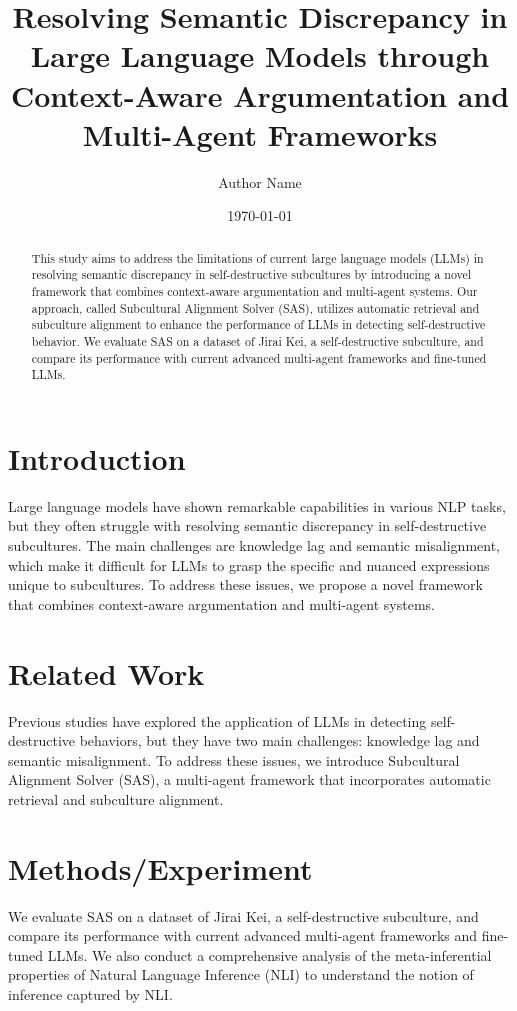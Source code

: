 \documentclass{article}
\begin{document}
\title{Resolving Semantic Discrepancy in Large Language Models through Context-Aware Argumentation and Multi-Agent Frameworks}
\author{Author Name}
\date{\today}

\maketitle

\begin{abstract}
This study aims to address the limitations of current large language models (LLMs) in resolving semantic discrepancy in self-destructive subcultures by introducing a novel framework that combines context-aware argumentation and multi-agent systems. Our approach, called Subcultural Alignment Solver (SAS), utilizes automatic retrieval and subculture alignment to enhance the performance of LLMs in detecting self-destructive behavior. We evaluate SAS on a dataset of Jirai Kei, a self-destructive subculture, and compare its performance with current advanced multi-agent frameworks and fine-tuned LLMs.
\end{abstract}

\section{Introduction}
Large language models have shown remarkable capabilities in various NLP tasks, but they often struggle with resolving semantic discrepancy in self-destructive subcultures. The main challenges are knowledge lag and semantic misalignment, which make it difficult for LLMs to grasp the specific and nuanced expressions unique to subcultures. To address these issues, we propose a novel framework that combines context-aware argumentation and multi-agent systems.

\section{Related Work}
Previous studies have explored the application of LLMs in detecting self-destructive behaviors, but they have two main challenges: knowledge lag and semantic misalignment. To address these issues, we introduce Subcultural Alignment Solver (SAS), a multi-agent framework that incorporates automatic retrieval and subculture alignment.

\section{Methods/Experiment}
We evaluate SAS on a dataset of Jirai Kei, a self-destructive subculture, and compare its performance with current advanced multi-agent frameworks and fine-tuned LLMs. We also conduct a comprehensive analysis of the meta-inferential properties of Natural Language Inference (NLI) to understand the notion of inference captured by NLI.
\end{document}
